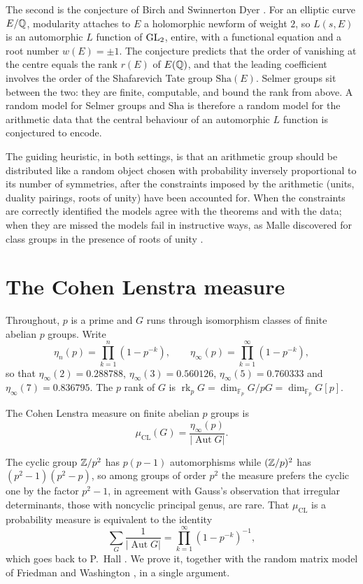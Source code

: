 The second is the conjecture of Birch and Swinnerton Dyer \cite{bsd1965}. For an elliptic curve $E/\mathbb{Q}$, modularity \cite{wiles1995,taylorwiles1995,bcdt2001} attaches to $E$ a holomorphic newform of weight $2$, so $L(s,E)$ is an automorphic $L$ function of $\mathrm{GL}_2$, entire, with a functional equation and a root number $w(E) = \pm1$. The conjecture predicts that the order of vanishing at the centre equals the rank $r(E)$ of $E(\mathbb{Q})$, and that the leading coefficient involves the order of the Shafarevich Tate group $\mathrm{Sha}(E)$. Selmer groups sit between the two: they are finite, computable, and bound the rank from above. A random model for Selmer groups and $\mathrm{Sha}$ is therefore a random model for the arithmetic data that the central behaviour of an automorphic $L$ function is conjectured to encode.

The guiding heuristic, in both settings, is that an arithmetic group should be distributed like a random object chosen with probability inversely proportional to its number of symmetries, after the constraints imposed by the arithmetic (units, duality pairings, roots of unity) have been accounted for. When the constraints are correctly identified the models agree with the theorems and with the data; when they are missed the models fail in instructive ways, as Malle discovered for class groups in the presence of roots of unity \cite{malle2008}.

\section{The Cohen Lenstra measure}\label{sec:06ccl}

Throughout, $p$ is a prime and $G$ runs through isomorphism classes of finite abelian $p$ groups. Write
\[
\eta_n(p) = \prod_{k=1}^n(1-p^{-k}),\qquad \eta_\infty(p) = \prod_{k=1}^\infty(1-p^{-k}),
\]
so that $\eta_\infty(2) = 0.288788$, $\eta_\infty(3) = 0.560126$, $\eta_\infty(5) = 0.760333$ and $\eta_\infty(7) = 0.836795$. The $p$ rank of $G$ is $\operatorname{rk}_pG = \dim_{\mathbb{F}_p}G/pG = \dim_{\mathbb{F}_p}G[p]$.

\begin{definition}\label{def:06ccl}
The Cohen Lenstra measure on finite abelian $p$ groups is
\[
\mu_{\mathrm{CL}}(G) = \frac{\eta_\infty(p)}{|\operatorname{Aut}G|}.
\]
\end{definition}

The cyclic group $\mathbb{Z}/p^2$ has $p(p-1)$ automorphisms while $(\mathbb{Z}/p)^2$ has $(p^2-1)(p^2-p)$, so among groups of order $p^2$ the measure prefers the cyclic one by the factor $p^2-1$, in agreement with Gauss's observation that irregular determinants, those with noncyclic principal genus, are rare. That $\mu_{\mathrm{CL}}$ is a probability measure is equivalent to the identity
\begin{equation}\label{eq:06chall}
\sum_G\frac{1}{|\operatorname{Aut}G|} = \prod_{k=1}^\infty(1-p^{-k})^{-1},
\end{equation}
which goes back to P.~Hall \cite{hall1938}. We prove it, together with the random matrix model of Friedman and Washington \cite{friedmanwashington1989}, in a single argument.

